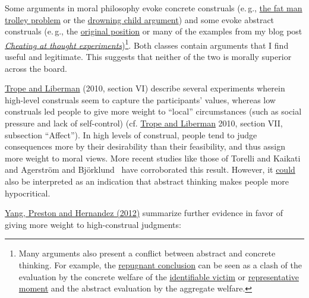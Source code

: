 Some arguments in moral philosophy evoke concrete construals (e.\,g.,
\href{https://en.wikipedia.org/wiki/Trolley_problem\#The_fat_man}{the
fat man trolley problem} or the
\href{https://en.wikipedia.org/wiki/Famine,_Affluence,_and_Morality}{drowning
child argument}) and some evoke abstract construals (e.\,g., the
\href{https://en.wikipedia.org/wiki/Original_position}{original
position} or many of the examples from my blog post
\href{https://casparoesterheld.com/2015/12/06/cheating-at-thought-experiments/}{\emph{Cheating
at thought experiments}})\footnote{Many arguments also present a
  conflict between abstract and concrete thinking. For example, the
  \href{https://en.wikipedia.org/wiki/Mere_addition_paradox}{repugnant
  conclusion} can be seen as a clash of the evaluation by the concrete
  welfare of the
  \href{https://en.wikipedia.org/wiki/Identifiable_victim_effect}{identifiable
  victim} or
  \href{https://en.wikipedia.org/wiki/Peak\%E2\%80\%93end_rule}{representative
  moment} and the abstract evaluation by the aggregate welfare.}. Both
classes contain arguments that I find useful and legitimate. This
suggests that neither of the two is morally superior across the board.

\href{http://www.psych.nyu.edu/trope/Trope_Liberman_2010.pdf}{Trope and Liberman} (2010, section VI) describe several experiments
wherein high-level construals seem to capture the participants' values,
whereas low construals led people to give more weight to ``local''
circumstances (such as social pressure and lack of self-control) (cf.
\href{http://www.psych.nyu.edu/trope/Trope_Liberman_2010.pdf}{Trope and Liberman} 2010, section VII, subsection ``Affect''). In high
levels of construal, people tend to judge consequences more by their
desirability than their feasibility, and thus assign more weight to
moral views. More recent studies like those of Torelli and Kaikati 
\citeyear{Torelli2009-mw} and Agerström and Björklund~
\citeyear{Agerstrom2013-ep} have corroborated this result.
However, it
\href{http://www.overcomingbias.com/2010/05/far-is-hypocritical.html}{could}
also be interpreted as an indication that abstract thinking makes people
more hypocritical.

\href{http://minerva.union.edu/bizerg/readings230/wk04.pdf}{Yang,
Preston and Hernandez (2012)} summarize further evidence in favor of
giving more weight to high-construal judgments:


